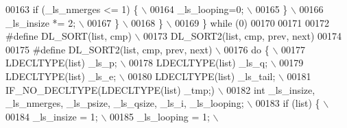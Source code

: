 \begin{DoxyCode}
00163 \textcolor{preprocessor}{      if (\_ls\_nmerges <= 1) \{                                                                  \(\backslash\)}
00164 \textcolor{preprocessor}{        \_ls\_looping=0;                                                                         \(\backslash\)}
00165 \textcolor{preprocessor}{      \}                                                                                        \(\backslash\)}
00166 \textcolor{preprocessor}{      \_ls\_insize *= 2;                                                                         \(\backslash\)}
00167 \textcolor{preprocessor}{    \}                                                                                          \(\backslash\)}
00168 \textcolor{preprocessor}{  \}                                                                                            \(\backslash\)}
00169 \textcolor{preprocessor}{\} while (0)}
00170 
00171 
00172 \textcolor{preprocessor}{#define DL\_SORT(list, cmp)                                                                     \(\backslash\)}
00173 \textcolor{preprocessor}{    DL\_SORT2(list, cmp, prev, next)}
00174 
00175 \textcolor{preprocessor}{#define DL\_SORT2(list, cmp, prev, next)                                                        \(\backslash\)}
00176 \textcolor{preprocessor}{do \{                                                                                           \(\backslash\)}
00177 \textcolor{preprocessor}{  LDECLTYPE(list) \_ls\_p;                                                                       \(\backslash\)}
00178 \textcolor{preprocessor}{  LDECLTYPE(list) \_ls\_q;                                                                       \(\backslash\)}
00179 \textcolor{preprocessor}{  LDECLTYPE(list) \_ls\_e;                                                                       \(\backslash\)}
00180 \textcolor{preprocessor}{  LDECLTYPE(list) \_ls\_tail;                                                                    \(\backslash\)}
00181 \textcolor{preprocessor}{  IF\_NO\_DECLTYPE(LDECLTYPE(list) \_tmp;)                                                        \(\backslash\)}
00182 \textcolor{preprocessor}{  int \_ls\_insize, \_ls\_nmerges, \_ls\_psize, \_ls\_qsize, \_ls\_i, \_ls\_looping;                       \(\backslash\)}
00183 \textcolor{preprocessor}{  if (list) \{                                                                                  \(\backslash\)}
00184 \textcolor{preprocessor}{    \_ls\_insize = 1;                                                                            \(\backslash\)}
00185 \textcolor{preprocessor}{    \_ls\_looping = 1;                                                                           \(\backslash\)}

\end{DoxyCode}
